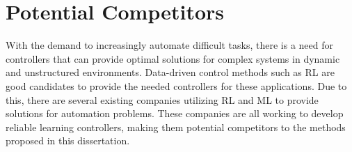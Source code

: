 \section{Potential Competitors}
%
With the demand to increasingly automate difficult tasks, there is a need for controllers that can provide optimal solutions for complex systems in dynamic and unstructured environments. Data-driven control methods such as RL are good candidates to provide the needed controllers for these applications. Due to this, there are several existing companies utilizing RL and ML to provide solutions for automation problems. These companies are all working to develop reliable learning controllers, making them potential competitors to the methods proposed in this dissertation.
%

